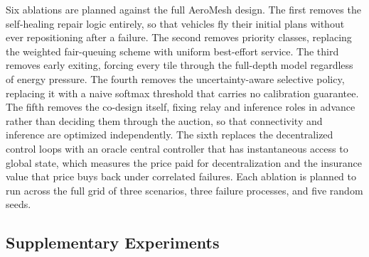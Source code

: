 \documentclass[drones,article,submit,moreauthors]{Definitions/mdpi}
\begin{document}
Six ablations are planned against the full AeroMesh design. The first removes the self-healing repair logic entirely, so that vehicles fly their initial plans without ever repositioning after a failure. The second removes priority classes, replacing the weighted fair-queuing scheme with uniform best-effort service. The third removes early exiting, forcing every tile through the full-depth model regardless of energy pressure. The fourth removes the uncertainty-aware selective policy, replacing it with a naive softmax threshold that carries no calibration guarantee. The fifth removes the co-design itself, fixing relay and inference roles in advance rather than deciding them through the auction, so that connectivity and inference are optimized independently. The sixth replaces the decentralized control loops with an oracle central controller that has instantaneous access to global state, which measures the price paid for decentralization and the insurance value that price buys back under correlated failures. Each ablation is planned to run across the full grid of three scenarios, three failure processes, and five random seeds.

\subsection{Supplementary Experiments}
\end{document}
